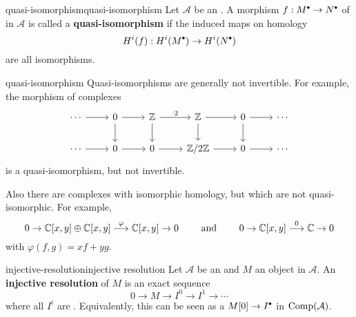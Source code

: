 \begin{topic}{quasi-isomorphism}{quasi-isomorphism}
    Let $\mathcal{A}$ be an . A morphism $f : M^\bdot \to N^\bdot$ of  in $\mathcal{A}$ is called a \textbf{quasi-isomorphism} if the induced maps on homology
    \[ H^i(f) : H^i(M^\bdot) \to H^i(N^\bdot) \]
    are all isomorphisms.
\end{topic}

\begin{example}{quasi-isomorphism}
    Quasi-isomorphisms are generally not invertible. For example, the morphism of complexes
    \[ \begin{tikzcd} \cdots \arrow{r} & 0 \arrow{d} \arrow{r} & \ZZ \arrow{r}{\cdot 2} \arrow{d} & \ZZ \arrow{r} \arrow{d} & 0 \arrow{r} \arrow{d} & \cdots \\ \cdots \arrow{r} & 0 \arrow{r} & 0 \arrow{r} & \ZZ/2\ZZ \arrow{r} & 0 \arrow{r} & \cdots  \end{tikzcd} \]
    is a quasi-isomorphism, but not invertible.
    
    Also there are complexes with isomorphic homology, but which are not quasi-isomorphic. For example,
    \[ 0 \to \mathbb{C}[x, y] \oplus \mathbb{C}[x, y] \overset{\varphi}{\longrightarrow} \mathbb{C}[x, y] \to 0 \qquad \text{ and } \qquad 0 \to \mathbb{C}[x, y] \overset{0}{\longrightarrow} \mathbb{C} \to 0 \]
    with $\varphi(f, g) = xf + yg$.
\end{example}

\begin{topic}{injective-resolution}{injective resolution}
    Let $\mathcal{A}$ be an  and $M$ an object in $\mathcal{A}$. An \textbf{injective resolution} of $M$ is an exact sequence
    \[ 0 \to M \to I^0 \to I^1 \to \cdots \]
    where all $I^i$ are . Equivalently, this can be seen as a  $M[0] \to I^\bdot$ in $\textup{Comp}(\mathcal{A})$.
\end{topic}

